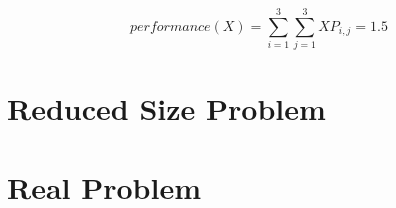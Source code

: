 \documentclass[a4paper]{article}
\begin{document}
$$performance(X) = \sum_{i=1}^{3}\sum_{j=1}^{3}XP_{i,j} = 1.5$$

\section{Reduced Size Problem}


\section{Real Problem}

\end{document}
